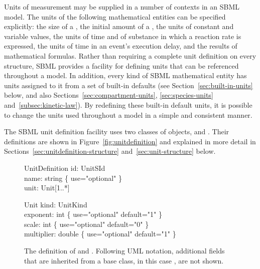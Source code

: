 Units of measurement may be supplied in a number of contexts in an
SBML model.  The units of the following mathematical entities can
be specified explicitly: the size of a \Compartment, the initial
amount of a \Species, the units of constant and variable
\Parameter values, the units of time and of substance in which a
reaction rate is expressed, the units of time in an event's
execution delay, and the results of mathematical formulas.  Rather
than requiring a complete unit definition on every structure, SBML
provides a facility for defining units that can be referenced
throughout a model.  In addition, every kind of SBML mathematical
entity has units assigned to it from a set of built-in defaults
(see Section~\ref{sec:built-in-units} below, and also
Sections~\ref{sec:compartment-units}, \ref{sec:species-units}
and~\ref{subsec:kinetic-law}).  By redefining these built-in
default units, it is possible to change the units used throughout
a model in a simple and consistent manner.

The SBML unit definition facility uses two classes of objects,
\UnitDefinition and \Unit.  Their definitions are shown in
Figure~\vref{fig:unitdefinition} and explained in more detail in
Sections~\ref{sec:unitdefinition-structure}
and~\ref{sec:unit-structure} below.

\begin{figure}[htb]
  \centering
  \begin{classbox}{UnitDefinition}
    id: UnitSId         \\
    name: string \{ use="optional" \} \\
    unit: Unit[1..*]                  \\
  \end{classbox}
  \hspace*{2em}
  \begin{classbox}{Unit}
    kind: UnitKind                                      \\
    exponent: int \{ use="optional" default="1" \}  \\
    scale: int \{ use="optional" default="0" \}     \\
    multiplier: double \{ use="optional" default="1" \} \\
  \end{classbox}
  \caption{The definition of \UnitDefinition and \Unit. Following UML
    notation, additional fields
    that are inherited from a base class, in this case \SBase, are not shown.}
  \label{fig:unitdefinition}
\end{figure}

